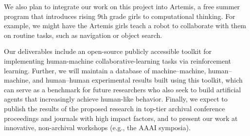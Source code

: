 We also plan to integrate our work on this project into Artemis, a
free summer program that introduces rising 9th grade girls to
computational thinking.  For example, we might have the Artemis girls
teach a robot to collaborate with them on routine tasks, such as
navigation or object search.

Our deliverables include an open-source publicly accessible toolkit
for implementing human-machine collaborative-learning tasks via
reinforcement learning. Further, we will maintain a database of
machine--machine, human--machine, and human--human experimental results
built using this toolkit, which can serve as a benchmark for future
researchers who also seek to build artificial agents that increasingly
achieve human-like behavior.
%
Finally, we expect to publish the results of the proposed research in
top-tier archival conference proceedings and journals with high
impact factors, and to present our work at innovative, non-archival
workshops (e.g., the AAAI symposia).

